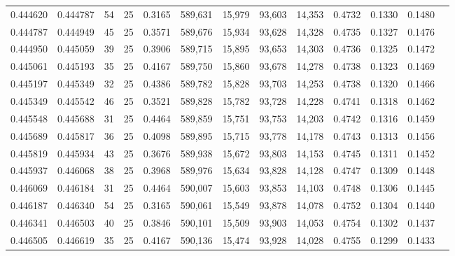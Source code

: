 \begin{tabular}{rrrrrrrrrrrrr}
0.444620 & 0.444787 &    54 &  25 &                                     0.3165 & 589,631 &  15,979 &  93,603 &  14,353 & 0.4732 & 0.1330 & 0.1480 \\
0.444787 & 0.444949 &    45 &  25 &                                     0.3571 & 589,676 &  15,934 &  93,628 &  14,328 & 0.4735 & 0.1327 & 0.1476 \\
0.444950 & 0.445059 &    39 &  25 &                                     0.3906 & 589,715 &  15,895 &  93,653 &  14,303 & 0.4736 & 0.1325 & 0.1472 \\
0.445061 & 0.445193 &    35 &  25 &                                     0.4167 & 589,750 &  15,860 &  93,678 &  14,278 & 0.4738 & 0.1323 & 0.1469 \\
0.445197 & 0.445349 &    32 &  25 &                                     0.4386 & 589,782 &  15,828 &  93,703 &  14,253 & 0.4738 & 0.1320 & 0.1466 \\
0.445349 & 0.445542 &    46 &  25 &                                     0.3521 & 589,828 &  15,782 &  93,728 &  14,228 & 0.4741 & 0.1318 & 0.1462 \\
0.445548 & 0.445688 &    31 &  25 &                                     0.4464 & 589,859 &  15,751 &  93,753 &  14,203 & 0.4742 & 0.1316 & 0.1459 \\
0.445689 & 0.445817 &    36 &  25 &                                     0.4098 & 589,895 &  15,715 &  93,778 &  14,178 & 0.4743 & 0.1313 & 0.1456 \\
0.445819 & 0.445934 &    43 &  25 &                                     0.3676 & 589,938 &  15,672 &  93,803 &  14,153 & 0.4745 & 0.1311 & 0.1452 \\
0.445937 & 0.446068 &    38 &  25 &                                     0.3968 & 589,976 &  15,634 &  93,828 &  14,128 & 0.4747 & 0.1309 & 0.1448 \\
0.446069 & 0.446184 &    31 &  25 &                                     0.4464 & 590,007 &  15,603 &  93,853 &  14,103 & 0.4748 & 0.1306 & 0.1445 \\
0.446187 & 0.446340 &    54 &  25 &                                     0.3165 & 590,061 &  15,549 &  93,878 &  14,078 & 0.4752 & 0.1304 & 0.1440 \\
0.446341 & 0.446503 &    40 &  25 &                                     0.3846 & 590,101 &  15,509 &  93,903 &  14,053 & 0.4754 & 0.1302 & 0.1437 \\
0.446505 & 0.446619 &    35 &  25 &                                     0.4167 & 590,136 &  15,474 &  93,928 &  14,028 & 0.4755 & 0.1299 & 0.1433 \\

\end{tabular}
